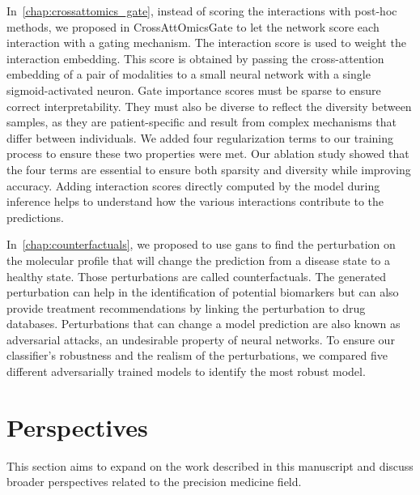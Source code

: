 \documentclass[../main.tex]{subfiles}
\begin{document}
	In~\cref{chap:crossattomics_gate}, instead of scoring the interactions with post-hoc methods, we proposed in CrossAttOmicsGate to let the network score each interaction with a gating mechanism.
	The interaction score is used to weight the interaction embedding.
	This score is obtained by passing the cross-attention embedding of a pair of modalities to a small neural network with a single sigmoid-activated neuron.
	Gate importance scores must be sparse to ensure correct interpretability. They must also be diverse to reflect the diversity between samples, as they are patient-specific and result from complex mechanisms that differ between individuals.
	We added four regularization terms to our training process to ensure these two properties were met.
	Our ablation study showed that the four terms are essential to ensure both sparsity and diversity while improving accuracy.
	Adding interaction scores directly computed by the model during inference helps to understand how the various interactions contribute to the predictions.

	In~\cref{chap:counterfactuals}, we proposed to use \glspl{gan} to find the perturbation on the molecular profile that will change the prediction from a disease state to a healthy state.
	Those perturbations are called counterfactuals.
	The generated perturbation can help in the identification of potential biomarkers but can also provide treatment recommendations by linking the perturbation to drug databases.
	Perturbations that can change a model prediction are also known as adversarial attacks, an undesirable property of neural networks.
	To ensure our classifier's robustness and the realism of the perturbations, we compared five different adversarially trained models to identify the most robust model.

\section{Perspectives}
	This section aims to expand on the work described in this manuscript and discuss broader perspectives related to the precision medicine field.
\end{document}
